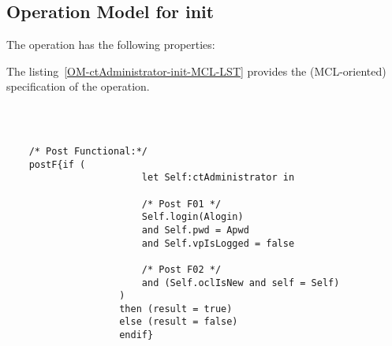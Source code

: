 \subsection{Operation Model for init}

\label{OM-init}


The  operation has the following properties:

	\begin{operationmodel}



		


	\end{operationmodel}



	\vspace{1cm}
	The listing~\ref{OM-ctAdministrator-init-MCL-LST} provides the \msrmessir (MCL-oriented) specification of the operation.
	
	\scriptsize
	\vspace{0.5cm}
	\begin{lstlisting}[style=MessirStyle,firstnumber=auto,captionpos=b,caption={\msrmessir (MCL-oriented) specification of the operation \emph{init}.},label=OM-ctAdministrator-init-MCL-LST]

	
	
	/* Post Functional:*/ 
	postF{if (
						let Self:ctAdministrator in
						
						/* Post F01 */
				 		Self.login(Alogin)
				 		and Self.pwd = Apwd
				 		and Self.vpIsLogged = false
				
				 		/* Post F02 */
				 		and (Self.oclIsNew and self = Self)
				 	)
				 	then (result = true)
				 	else (result = false)
				   	endif}
	
	
	\end{lstlisting}
	\normalsize 
	
	
	
	





